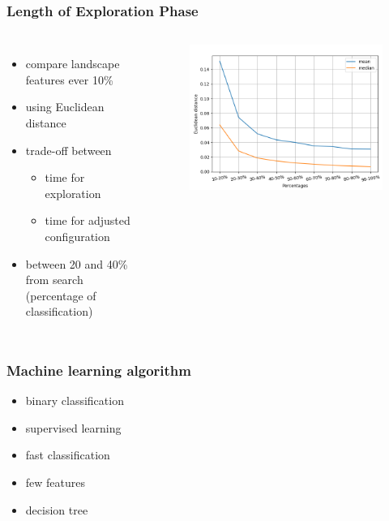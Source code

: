 \begin{frame}
	\frametitle{Length of Exploration Phase}
	
	\begin{columns}[c]
		

		\begin{itemize}
			\item compare landscape features ever 10\%
			\item using Euclidean distance
			\item trade-off between
				\begin{itemize}
					\item time for exploration
					\item time for adjusted configuration
				\end{itemize}
			\item between 20 and 40\% from search (percentage of classification)
		\end{itemize}
		
		\begin{figure}
			\includegraphics[width=1\textwidth]{figures/euclidean_distances}
		\end{figure}
		
		
	\end{columns}
	
\end{frame}

\begin{frame}
	\frametitle{Machine learning algorithm}
	
	\begin{itemize}
		\item binary classification
		\item supervised learning
		\item fast classification
		\item few features
		\item decision tree
	\end{itemize}
	
\end{frame}

